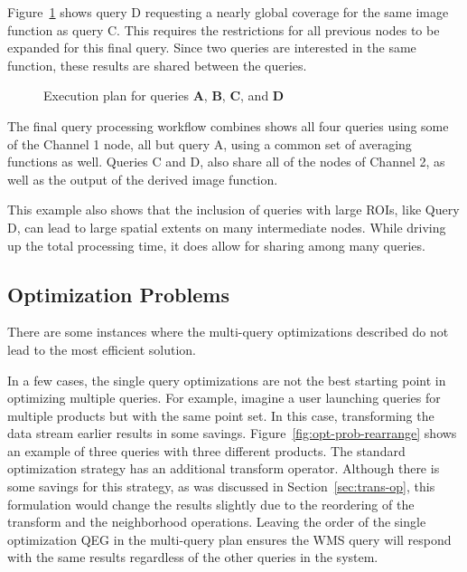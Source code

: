 \documentclass{ucdthesis}       %
\newcommand{\qry}[1]{{\bf #1}}
\begin{document}
Figure~\ref{fig:exe-plan-d} shows query D requesting a nearly global
coverage for the same image function as query C.  This requires the
restrictions for all previous nodes to be expanded for this final
query.  Since two queries are interested in the same function, these
results are shared between the queries.

\begin{figure}[htb]
  \centering
  \scalebox{1.2}{}
  \caption{Execution plan for queries \qry{A}, \qry{B}, \qry{C}, and \qry{D}}
  \label{fig:exe-plan-d}
\end{figure}

The final query processing workflow combines shows all four queries
using some of the Channel 1 node, all but query A, using a common set
of averaging functions as well.  Queries C and D, also share all of
the nodes of Channel 2, as well as the output of the derived image
function.

This example also shows that the inclusion of queries with large
\acp{ROI}, like Query D, can lead to large spatial extents on many
intermediate nodes.  While driving up the total processing time, it
does allow for sharing among many queries.

\subsection{Optimization Problems}
\label{sec:multi-problems}

There are some instances where the multi-query optimizations described
do not lead to the most efficient solution.

In a few cases, the single query optimizations are not the best
starting point in optimizing multiple queries.  For example, imagine a
user launching queries for multiple products but with the same point
set.  In this case, transforming the data stream earlier results in
some savings.  Figure~\ref{fig:opt-prob-rearrange} shows an example of
three queries with three different products.  The standard
optimization strategy has an additional transform operator.  Although
there is some savings for this strategy, as was discussed in
Section~\ref{sec:trans-op}, this formulation would change the results
slightly due to the reordering of the transform and the neighborhood
operations.  Leaving the order of the single optimization \ac{QEG} in
the multi-query plan ensures the \ac{WMS} query will respond with the
same results regardless of the other queries in the system.
\end{document}
